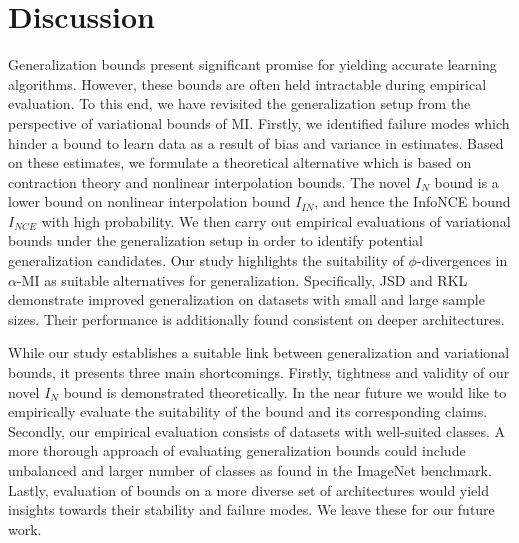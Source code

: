 \documentclass{article}
\begin{document}
\section{Discussion}
Generalization bounds present significant promise for yielding accurate learning algorithms. However, these bounds are often held intractable during empirical evaluation. To this end, we have revisited the generalization setup from the perspective of variational bounds of MI. Firstly, we identified failure modes which hinder a bound to learn data as a result of bias and variance in estimates. Based on these estimates, we formulate a theoretical alternative which is based on contraction theory and nonlinear interpolation bounds. The novel $I_{N}$ bound is a lower bound on nonlinear interpolation bound $I_{IN}$, and hence the InfoNCE bound $I_{NCE}$ with high probability. We then carry out empirical evaluations of variational bounds under the generalization setup in order to identify potential generalization candidates. Our study highlights the suitability of $\phi$-divergences in $\alpha$-MI as suitable alternatives for generalization. Specifically, JSD and RKL demonstrate improved generalization on datasets with small and large sample sizes. Their performance is additionally found consistent on deeper architectures. 

While our study establishes a suitable link between generalization and variational bounds, it presents three main shortcomings. Firstly, tightness and validity of our novel $I_{N}$ bound is demonstrated theoretically. In the near future we would like to empirically evaluate the suitability of the bound and its corresponding claims. Secondly, our empirical evaluation consists of datasets with well-suited classes. A more thorough approach of evaluating generalization bounds could include unbalanced and larger number of classes as found in the ImageNet benchmark. Lastly, evaluation of bounds on a more diverse set of architectures would yield insights towards their stability and failure modes. We leave these for our future work.  

 
\small{}

\newpage
\appendix
\end{document}
